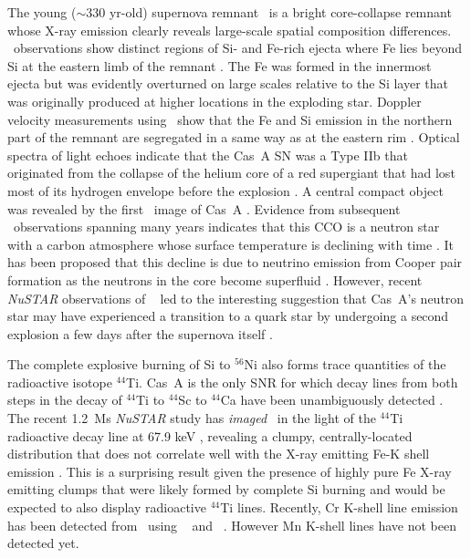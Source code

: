 \documentclass[11pt,a4paper]{article}
\begin{document}
{The young ($\sim$330 yr-old) supernova remnant \casa\ is a bright
core-collapse remnant whose X-ray emission clearly reveals large-scale
spatial composition differences. \chandra\ observations show distinct
regions of Si- and Fe-rich ejecta where Fe lies beyond Si at the
eastern limb of the remnant \citep{hughes00b}. The Fe was formed in
the innermost ejecta but was evidently overturned on large scales
relative to the Si layer that was originally produced at higher
locations in the exploding star.  Doppler velocity measurements using
\xmm\ show that the Fe and Si emission in the northern part of the
remnant are segregated in a same way as at the eastern rim
\citep{willingale02}.  Optical spectra of light echoes indicate that
the Cas~A SN was a Type IIb that originated from the collapse of the
helium core of a red supergiant that had lost most of its hydrogen
envelope before the explosion \citep{krause08a}.  A central compact
object was revealed by the first \chandra\ image of Cas~A
\citep{tananbaum99}.  Evidence from subsequent \chandra\ observations
spanning many years indicates that this CCO is a neutron star with a
carbon atmosphere whose surface temperature is declining with time
\citep{heinke10}.  It has been proposed that this decline is due to
neutrino emission from Cooper pair formation as the neutrons in the
core become superfluid \citep{shternin11}. However, recent {\it NuSTAR} observations
of \casa\ \citep{casa_nustar} led to the interesting suggestion that Cas~A's 
neutron star may have experienced a transition to a quark star
by undergoing a second explosion a few days after the supernova itself
\citep{laming14, ouyed14}.



The complete explosive burning of Si to $^{56}$Ni also forms trace
quantities of the radioactive isotope $^{44}$Ti. Cas~A is the only SNR
for which decay lines from both steps in the decay of $^{44}$Ti to
$^{44}$Sc to $^{44}$Ca have been unambiguously detected
\citep{Iyudin94,Vink01}. The recent 1.2~Ms {\it NuSTAR} study 
 has {\it imaged} \casa\ in the light of the $^{44}$Ti
radioactive decay line at 67.9 keV \citep{casa_nustar}, revealing a clumpy,
centrally-located distribution that does not correlate well with the
X-ray emitting Fe-K shell emission \citep{hughes00b,hwang04}.  This is
a surprising result given the presence of highly pure Fe
X-ray emitting clumps \citep{hwang03} that were likely formed by
complete Si burning and would be expected to also display radioactive
$^{44}$Ti lines.  Recently, Cr K-shell line emission has been detected
from \casa\ using \chandra\ \citep{Yang09} and
\suzaku\ \citep{Maeda09}. However Mn K-shell lines have not been
detected yet.

}
\end{document}
